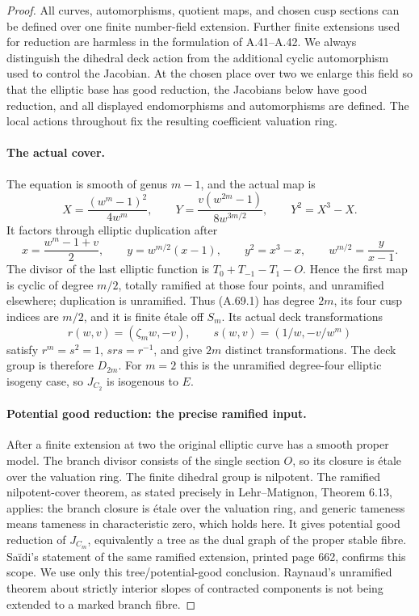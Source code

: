 \begin{proof}
All curves, automorphisms, quotient maps, and chosen cusp sections can
be defined over one finite number-field extension. Further finite
extensions used for reduction are harmless in the formulation of
A.41--A.42. We always distinguish the dihedral deck action from the
additional cyclic automorphism used to control the Jacobian.
At the chosen place over two we enlarge this field so that the
elliptic base has good reduction, the Jacobians below have good
reduction, and all displayed endomorphisms and automorphisms are
defined. The local actions throughout fix the resulting coefficient
valuation ring.

\paragraph{The actual cover.}
The equation is smooth of genus \(m-1\), and the actual map is
\[
 X=\frac{(w^m-1)^2}{4w^m},\qquad
 Y=\frac{v(w^{2m}-1)}{8w^{3m/2}},\qquad Y^2=X^3-X.
                                                        \tag{A.69.1}
\]
It factors through elliptic duplication after
\[
 x=\frac{w^m-1+v}{2},\qquad y=w^{m/2}(x-1),
 \qquad y^2=x^3-x,\qquad w^{m/2}=\frac{y}{x-1}.
                                                        \tag{A.69.2}
\]
The divisor of the last elliptic function is
\(T_0+T_{-1}-T_1-O\). Hence the first map is cyclic of degree
\(m/2\), totally ramified at those four points, and unramified
elsewhere; duplication is unramified. Thus (A.69.1) has degree
\(2m\), its four cusp indices are \(m/2\), and it is finite
\'{e}tale off \(S_m\). Its actual deck transformations
\[
 r(w,v)=(\zeta_m w,-v),\qquad s(w,v)=(1/w,-v/w^m)
                                                        \tag{A.69.3}
\]
satisfy \(r^m=s^2=1\), \(srs=r^{-1}\), and give \(2m\)
distinct transformations. The deck group is therefore
\(D_{2m}\). For \(m=2\) this is the unramified degree-four
elliptic isogeny case, so \(J_{C_2}\) is isogenous to \(E\).

\paragraph{Potential good reduction: the precise ramified input.}
After a finite extension at two the original elliptic curve has a
smooth proper model. The branch divisor consists of the single
section \(O\), so its closure is \'{e}tale over the valuation ring.
The finite dihedral group is nilpotent. The ramified
nilpotent-cover theorem, as stated precisely in
Lehr--Matignon, Theorem 6.13, applies: the branch closure is \'{e}tale
over the valuation ring, and generic tameness means tameness in
characteristic zero, which holds here. It gives potential good
reduction of \(J_{C_m}\), equivalently a tree as the dual graph of
the proper stable fibre. Sa\"idi's statement of the same ramified
extension, printed page 662, confirms this scope.
\cite{fghLehrMatignon2005,fghSaidi2007}
We use only this tree/potential-good conclusion. Raynaud's
unramified theorem about strictly interior slopes of contracted
components is not being extended to a marked branch fibre.


\end{proof}
